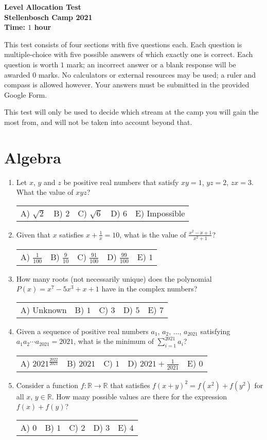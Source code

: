 \documentclass{article}
\newcommand{\answers}[5]{
  \begin{center}
    \begin{tabular}{*{5}{p{0.15\textwidth}}}
      A) #1 & B) #2 & C) #3 & D) #4 & E) #5
    \end{tabular}
  \end{center}
}
\begin{document}
\thispagestyle{empty}

\begin{center}
  \textbf{\Large Level Allocation Test}
  \\ \vspace{1em}
  \textbf{\large Stellenbosch Camp 2021}
  \\ \vspace{1em}
  \textbf{\large Time: $1$ hour}
\end{center}

\bigskip

This test consists of four sections with five questions each.
Each question is multiple-choice with five possible answers of which exactly one is correct.
Each question is worth $1$ mark; an incorrect answer or a blank response will be awarded $0$ marks.
No calculators or external resources may be used; a ruler and compass is allowed however.
Your answers must be submitted in the provided Google Form.

This test will only be used to decide which stream at the camp you will gain the most from, and will not be taken into account beyond that.


\section{Algebra}
\begin{enumerate}

\item %
Let $x$, $y$ and $z$ be positive real numbers that satisfy $xy = 1$, $yz = 2$, $zx = 3$.
What the value of $xyz$? 
\answers{$\sqrt{2}$}{$2$}{$\sqrt{6}$}{$6$}{Impossible}

\item %
Given that $x$ satisfies $x + \frac{1}{x} = 10$, what is the value of $\frac{x^2-x+1}{x^2 +1}$?
\answers{$\frac{1}{100}$}{$\frac{9}{10}$}{$\frac{91}{100}$}{$\frac{99}{100}$}{$1$}

\item %
How many roots (not necessarily unique) does the polynomial $P(x) = x^7-5x^3 + x + 1$ have in the complex numbers?
\answers{Unknown}{$1$}{$3$}{$5$}{$7$}

\item %
Given a sequence of positive real numbers $a_1$, $a_2$, ..., $a_{2021}$ satisfying $a_1a_2 \cdots a_{2021} = 2021$, what is the minimum of $\sum_{i = 1}^{2021} a_i$?
\answers{$2021^\frac{2022}{2021}$}{$2021$}{$1$}{$2021 + \frac{1}{2021}$}{$0$}

\item %
Consider a function $f: \mathbb{R} \rightarrow \mathbb{R}$ that satisfies $f(x + y)^2 = f(x^2) + f(y^2)$ for all $x$, $y \in \mathbb{R}$.
How many possible values are there for the expression $f(x) + f(y)$?
\answers{$0$}{$1$}{$2$}{$3$}{$4$}

\end{enumerate}
\end{document}
